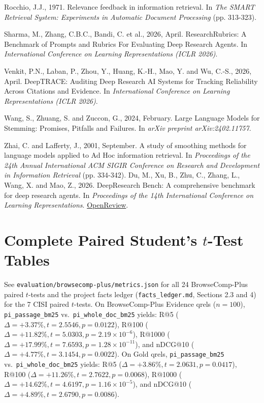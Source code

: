 \documentclass[conference]{IEEEtran}
\begin{document}
\noindent Rocchio, J.J., 1971. Relevance feedback in information retrieval. In \textit{The SMART Retrieval System: Experiments in Automatic Document Processing} (pp. 313-323).\smallskip

\noindent Sharma, M., Zhang, C.B.C., Bandi, C. et al., 2026, April. ResearchRubrics: A Benchmark of Prompts and Rubrics For Evaluating Deep Research Agents. In \textit{International Conference on Learning Representations (ICLR 2026)}.\smallskip

\noindent Venkit, P.N., Laban, P., Zhou, Y., Huang, K.-H., Mao, Y. and Wu, C.-S., 2026, April. DeepTRACE: Auditing Deep Research AI Systems for Tracking Reliability Across Citations and Evidence. In \textit{International Conference on Learning Representations (ICLR 2026)}.\smallskip

\noindent Wang, S., Zhuang, S. and Zuccon, G., 2024, February. Large Language Models for Stemming: Promises, Pitfalls and Failures. In \textit{arXiv preprint arXiv:2402.11757}.\smallskip

\noindent Zhai, C. and Lafferty, J., 2001, September. A study of smoothing methods for language models applied to Ad Hoc information retrieval. In \textit{Proceedings of the 24th Annual International ACM SIGIR Conference on Research and Development in Information Retrieval} (pp. 334-342).
\noindent Du, M., Xu, B., Zhu, C., Zhang, L., Wang, X. and Mao, Z., 2026. DeepResearch Bench: A comprehensive benchmark for deep research agents. In \textit{Proceedings of the 14th International Conference on Learning Representations}. \href{https://openreview.net/forum?id=hQ0K2Hhq7H}{OpenReview}.\smallskip

\endgroup

\appendices
\section{\texorpdfstring{Complete Paired Student's $t$-Test Tables}{Complete Paired Student's t-Test Tables}}
See \texttt{evaluation/browsecomp-plus/metrics.json} for all 24 BrowseComp-Plus paired $t$-tests and the project facts ledger (\texttt{facts\_ledger.md}, Sections 2.3 and 4) for the 7 CISI paired $t$-tests. On BrowseComp-Plus Evidence qrels ($n=100$), \texttt{pi\_passage\_bm25} vs.\ \texttt{pi\_whole\_doc\_bm25} yields: R@5 ($\Delta=+3.37\%, t=2.5546, p=0.0122$), R@100 ($\Delta=+11.82\%, t=5.0303, p=2.19\times 10^{-6}$), R@1000 ($\Delta=+17.99\%, t=7.6593, p=1.28\times 10^{-11}$), and nDCG@10 ($\Delta=+4.77\%, t=3.1454, p=0.0022$). On Gold qrels, \texttt{pi\_passage\_bm25} vs.\ \texttt{pi\_whole\_doc\_bm25} yields: R@5 ($\Delta=+3.86\%, t=2.0631, p=0.0417$), R@100 ($\Delta=+11.26\%, t=2.7622, p=0.0068$), R@1000 ($\Delta=+14.62\%, t=4.6197, p=1.16\times 10^{-5}$), and nDCG@10 ($\Delta=+4.89\%, t=2.6790, p=0.0086$).
\end{document}
